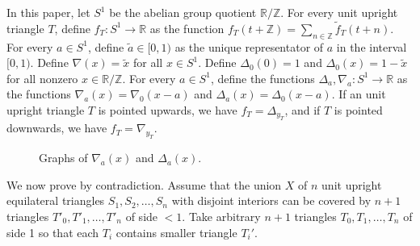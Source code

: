 \documentclass[a4paper]{amsart}
\theoremstyle{plain}
\theoremstyle{definition}
\begin{document}
In this paper, let \(S^1\) be the abelian group quotient \(\mathbb{R} /\mathbb{Z}\). For every unit upright triangle \(T\), define \(f_T : S^1 \to \mathbb{R}\) as the function \(f_T(t + \mathbb{Z}) = \sum_{n \in \mathbb{Z}} \tilde{f}_T(t + n)\).
For every \(a \in S^1\), define \(\tilde{a} \in [0, 1)\) as the unique representator of \(a\) in the interval \([0, 1)\). Define \(\nabla (x) = \tilde{x}\) for all \(x \in S^1\). Define \(\Delta_0 (0) = 1\) and \(\Delta_0(x) = 1 - \tilde{x}\) for all nonzero \(x \in \mathbb{R}/\mathbb{Z}\). For every \(a \in S^1\), define the functions \(\Delta_a , \nabla_a : S^1 \to \mathbb{R}\) as the functions \(\nabla_a(x) = \nabla_0(x-a)\) and \(\Delta_a(x) = \Delta_0(x-a)\). If an unit upright triangle \(T\) is pointed upwards, we have \(f_T = \Delta_{y_T}\), and if \(T\) is pointed downwards, we have \(f_T = \nabla_{y_T}\). 


\begin{figure}
  \centering
  \qquad
  \label{fig:graph}
  \caption{Graphs of $\nabla_a(x)$ and $\Delta_a(x)$.}
\end{figure}


We now prove  by contradiction. Assume that the union \(X\) of \(n\) unit upright equilateral triangles \(S_1, S_2, \dots, S_n\) with disjoint interiors can be covered by \(n+1\) triangles \(T'_0, T'_1, \dots, T'_n\) of side \(< 1\). Take arbitrary \(n + 1\) triangles \(T_0, T_1, \dots, T_n\) of side 1 so that each \(T_i\) contains smaller triangle \(T_i'\).
\end{document}
